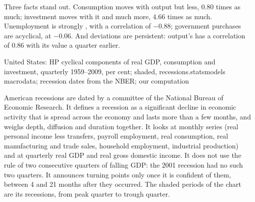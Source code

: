 Three facts stand out. Consumption moves with output but less, 0.80 times as much; investment moves with it and much more, 4.66
times as much. Unemployment is strongly , with a correlation of $-0.88$; government purchases are acyclical, at
$-0.06$. And deviations are persistent: output's  has a correlation of 0.86 with its value a quarter earlier.

\begin{omchart}{United States: HP cyclical components of real GDP, consumption and investment, quarterly 1959--2009, per
  cent; shaded, recessions.}{statsmodels macrodata; recession dates from the NBER; our computation}
\end{omchart}

\begin{measure}
American recessions are dated by a committee of the National Bureau of Economic Research. It defines a recession as a
significant decline in economic activity that is spread across the economy and lasts more than a few months, and weighs
depth, diffusion and duration together. It looks at monthly series (real personal income less transfers, payroll
employment, real consumption, real manufacturing and trade sales, household employment, industrial production) and at
quarterly real GDP and real gross domestic income. It does not use the rule of two consecutive quarters of falling GDP: the
2001 recession had no such two quarters. It announces turning points only once it is confident of them, between 4 and 21 months
after they occurred. The shaded periods of the chart are its recessions, from peak quarter to trough quarter.
\end{measure}

